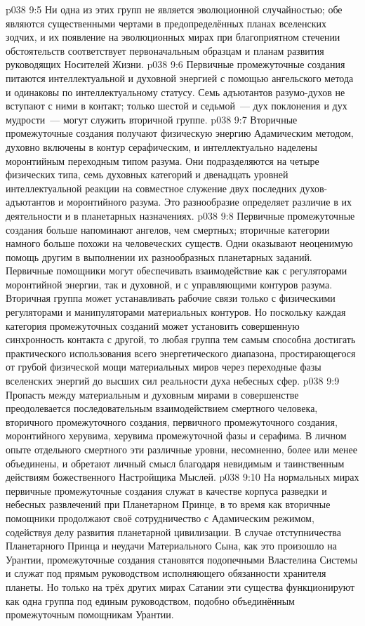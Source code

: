 \vs p038 9:5 \pc Ни одна из этих групп не является эволюционной случайностью; обе являются существенными чертами в предопределённых планах вселенских зодчих, и их появление на эволюционных мирах при благоприятном стечении обстоятельств соответствует первоначальным образцам и планам развития руководящих Носителей Жизни.
\vs p038 9:6 Первичные промежуточные создания питаются интеллектуальной и духовной энергией с помощью ангельского метода и одинаковы по интеллектуальному статусу. Семь адъютантов разумо\hyp{}духов не вступают с ними в контакт; только шестой и седьмой~--- дух поклонения и дух мудрости~--- могут служить вторичной группе.
\vs p038 9:7 Вторичные промежуточные создания получают физическую энергию Адамическим методом, духовно включены в контур серафическим, и интеллектуально наделены моронтийным переходным типом разума. Они подразделяются на четыре физических типа, семь духовных категорий и двенадцать уровней интеллектуальной реакции на совместное служение двух последних духов\hyp{}адъютантов и моронтийного разума. Это разнообразие определяет различие в их деятельности и в планетарных назначениях.
\vs p038 9:8 Первичные промежуточные создания больше напоминают ангелов, чем смертных; вторичные категории намного больше похожи на человеческих существ. Одни оказывают неоценимую помощь другим в выполнении их разнообразных планетарных заданий. Первичные помощники могут обеспечивать взаимодействие как с регуляторами моронтийной энергии, так и духовной, и с управляющими контуров разума. Вторичная группа может устанавливать рабочие связи только с физическими регуляторами и манипуляторами материальных контуров. Но поскольку каждая категория промежуточных созданий может установить совершенную синхронность контакта с другой, то любая группа тем самым способна достигать практического использования всего энергетического диапазона, простирающегося от грубой физической мощи материальных миров через переходные фазы вселенских энергий до высших сил реальности духа небесных сфер.
\vs p038 9:9 Пропасть между материальным и духовным мирами в совершенстве преодолевается последовательным взаимодействием смертного человека, вторичного промежуточного создания, первичного промежуточного создания, моронтийного херувима, херувима промежуточной фазы и серафима. В личном опыте отдельного смертного эти различные уровни, несомненно, более или менее объединены, и обретают личный смысл благодаря невидимым и таинственным действиям божественного Настройщика Мыслей.
\vs p038 9:10 \pc На нормальных мирах первичные промежуточные создания служат в качестве корпуса разведки и небесных развлечений при Планетарном Принце, в то время как вторичные помощники продолжают своё сотрудничество с Адамическим режимом, содействуя делу развития планетарной цивилизации. В случае отступничества Планетарного Принца и неудачи Материального Сына, как это произошло на Урантии, промежуточные создания становятся подопечными Властелина Системы и служат под прямым руководством исполняющего обязанности хранителя планеты. Но только на трёх других мирах Сатании эти существа функционируют как одна группа под единым руководством, подобно объединённым промежуточным помощникам Урантии.
